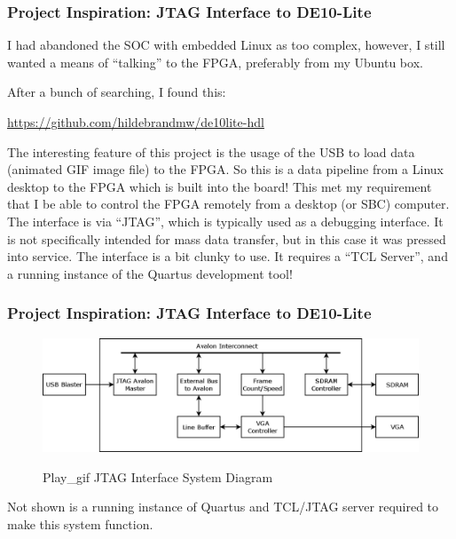 \documentclass{beamer}
\begin{document}
\begin{frame}
\frametitle{Project Inspiration:  JTAG Interface to DE10-Lite}

I had abandoned the SOC with embedded Linux as too complex, however, I still wanted a means of ``talking'' to the FPGA, preferably from my Ubuntu box.

After a bunch of searching, I found this:

\url{https://github.com/hildebrandmw/de10lite-hdl}

The interesting feature of this project is the usage of the USB to load data (animated GIF image file) to
the FPGA. So this is a data pipeline from a Linux desktop to the FPGA which is built into the board! This
met my requirement that I be able to control the FPGA remotely from a desktop (or SBC) computer.
The interface is via “JTAG”, which is typically used as a debugging interface. It is not specifically intended
for mass data transfer, but in this case it was pressed into service.
The interface is a bit clunky to use. It requires a “TCL Server”, and a running instance of the Quartus
development tool!

\end{frame}

\begin{frame}
\frametitle{Project Inspiration:  JTAG Interface to DE10-Lite}

\begin{figure}[h]
	\centering
	\includegraphics[width=1.0\textwidth]{graphics/play_gif.png}
	\centering\bfseries
	\caption{Play\_gif JTAG Interface System Diagram}
\end{figure}

Not shown is a running instance of Quartus and TCL/JTAG server required to make this system function.

\end{frame}
\end{document}
